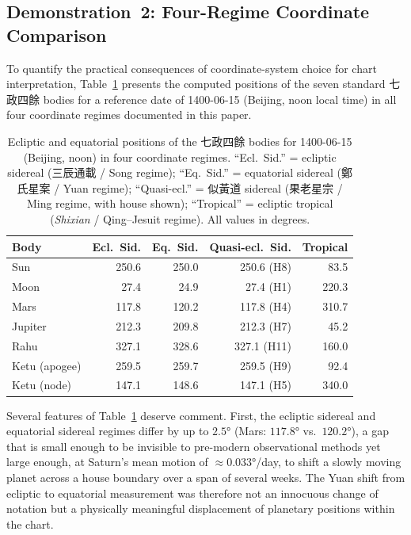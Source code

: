 \documentclass[10pt,a4paper]{article}
\newcommand{\zh}[1]{#1}
\providecommand{\degree}{\ensuremath{°}}
\begin{document}
\subsection*{Demonstration~2: Four-Regime Coordinate Comparison}

To quantify the practical consequences of coordinate-system choice for chart
interpretation, Table~\ref{tab:four-regime} presents the computed positions of
the seven standard \zh{七政四餘} bodies for a reference date of 1400-06-15
(Beijing, noon local time) in all four coordinate regimes documented in
this paper.

\begin{table}[ht]
\centering
\caption{Ecliptic and equatorial positions of the \zh{七政四餘} bodies for
1400-06-15 (Beijing, noon) in four coordinate regimes.  ``Ecl.\ Sid.'' = ecliptic
sidereal (\zh{三辰通載} / Song regime); ``Eq.\ Sid.'' = equatorial sidereal
(\zh{鄭氏星案} / Yuan regime); ``Quasi-ecl.'' = \zh{似黃道} sidereal
(\zh{果老星宗} / Ming regime, with house shown); ``Tropical'' = ecliptic tropical
(\textit{Shixian} / Qing--Jesuit regime).  All values in degrees.}
\label{tab:four-regime}
\small
\begin{tabular}{lrrrr}
\toprule
\textbf{Body} & \textbf{Ecl.\ Sid.} & \textbf{Eq.\ Sid.} & \textbf{Quasi-ecl.\ Sid.} & \textbf{Tropical} \\
\midrule
Sun          & 250.6 & 250.0 & 250.6 (H8)  &  83.5 \\
Moon         &  27.4 &  24.9 &  27.4 (H1)  & 220.3 \\
Mars         & 117.8 & 120.2 & 117.8 (H4)  & 310.7 \\
Jupiter      & 212.3 & 209.8 & 212.3 (H7)  &  45.2 \\
Rahu         & 327.1 & 328.6 & 327.1 (H11) & 160.0 \\
Ketu (apogee)& 259.5 & 259.7 & 259.5 (H9)  &  92.4 \\
Ketu (node)  & 147.1 & 148.6 & 147.1 (H5)  & 340.0 \\
\bottomrule
\end{tabular}
\end{table}

Several features of Table~\ref{tab:four-regime} deserve comment.  First, the
ecliptic sidereal and equatorial sidereal regimes differ by up to $2.5\degree$
(Mars: $117.8\degree$ vs.\ $120.2\degree$), a gap that is small enough to be
invisible to pre-modern observational methods yet large enough, at Saturn's mean
motion of $\approx 0.033\degree$/day, to shift a slowly moving planet across a
house boundary over a span of several weeks.  The Yuan shift from ecliptic to
equatorial measurement was therefore not an innocuous change of notation but a
physically meaningful displacement of planetary positions within the chart.
\end{document}
